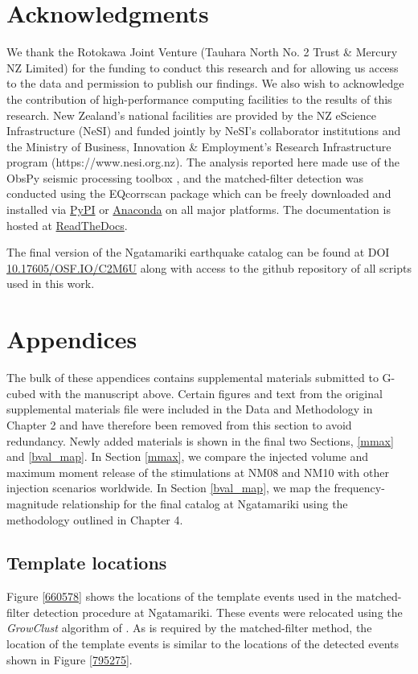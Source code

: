 \section{Acknowledgments}
We thank the Rotokawa Joint Venture (Tauhara North No. 2 Trust \& Mercury NZ Limited) for the funding to conduct this research and for allowing us access to the data and permission to publish our findings. We also wish to acknowledge the contribution of high-performance computing facilities to the results of this research. New Zealand's national facilities are provided by the NZ eScience Infrastructure (NeSI) and funded jointly by NeSI's collaborator institutions and the Ministry of Business, Innovation \& Employment's Research Infrastructure program (https://www.nesi.org.nz). The analysis reported here made use of the ObsPy seismic processing toolbox \citep{obspy_doi}, and the matched-filter detection was conducted using the EQcorrscan package \citep{Chamberlain_2017, eqcorrscan_doi} which can be freely downloaded and installed via \href{https://pypi.python.org/pypi/EQcorrscan}{PyPI} or \href{https://anaconda.org/conda-forge/eqcorrscan}{Anaconda} on all major platforms. The documentation is hosted at \href{http://eqcorrscan.readthedocs.io/en/latest/}{ReadTheDocs}.

The final version of the Ngatamariki earthquake catalog can be found at DOI \href{10.17605/OSF.IO/C2M6U}{10.17605/OSF.IO/C2M6U} along with access to the github repository of all scripts used in this work.


\section{Appendices}
The bulk of these appendices contains supplemental materials submitted to G-cubed with the manuscript above. Certain figures and text from the original supplemental materials file were included in the Data and Methodology in Chapter 2 and have therefore been removed from this section to avoid redundancy. Newly added materials is shown in the final two Sections, \ref{mmax} and \ref{bval_map}. In Section \ref{mmax}, we compare the injected volume and maximum moment release of the \glspl{stimulation} at NM08 and NM10 with other injection scenarios worldwide. In Section \ref{bval_map}, we map the frequency-magnitude relationship for the final catalog at Ngatamariki using the methodology outlined in Chapter 4.

\subsection{Template locations}
Figure \ref{660578} shows the locations of the template events used in the matched-filter detection procedure at Ngatamariki. These events were relocated using the \textit{GrowClust} algorithm of \citet{Trugman_2017}. As is required by the matched-filter method, the location of the template events is similar to the locations of the detected events shown in Figure \ref{795275}.


